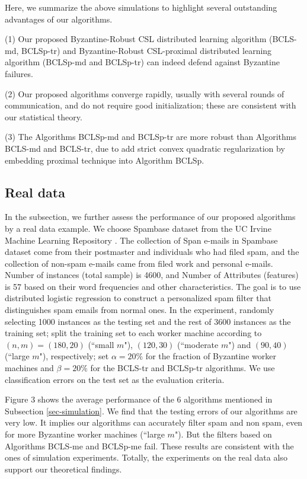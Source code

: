 \documentclass[12pt,a4paper]{article}%
\numberwithin{equation}{section}
\begin{document}
Here, we summarize the above simulations to highlight several outstanding advantages of our algorithms.

(1) Our proposed Byzantine-Robust CSL distributed learning algorithm (BCLS-md, BCLSp-tr) and Byzantine-Robust CSL-proximal distributed learning algorithm (BCLSp-md and BCLSp-tr) can indeed defend against Byzantine failures.

(2) Our proposed algorithms converge rapidly, usually with several rounds of communication, and do not require good initialization; these are consistent with our statistical theory.

(3) The Algorithms BCLSp-md and BCLSp-tr are more robust than Algorithms BCLS-md and BCLS-tr, due to add strict convex quadratic regularization by embedding proximal technique into Algorithm BCLSp.


\subsection{Real data}
In the subsection, we further assess the performance of our proposed algorithms by a real data example. We choose Spambase dataset from the UC Irvine Machine Learning Repository \citep{DuaGraff2017}. The collection of Span e-mails in Spambase dataset come from their postmaster and individuals who had filed spam, and the collection of non-spam e-mails came from filed work and personal e-mails. Number of instances (total sample) is 4600, and Number of Attributes (features) is 57 based on their word frequencies and other characteristics. The goal is to use distributed logistic regression to construct a personalized spam filter that distinguishes spam emails from normal ones. In the experiment, randomly selecting 1000 instances as the testing set and the rest of 3600 instances as the training set; split the training set to each worker machine according to $(n,m)=(180,20)$ (``small $m$"), $(120,30)$ (``moderate $m$") and $(90,40)$ (``large $m$"), respectively; set $\alpha=20\%$ for the fraction of Byzantine worker machines and $\beta=20\%$ for the BCLS-tr and BCLSp-tr algorithms. We use classification errors on the test set as the evaluation criteria.

Figure 3 shows the average performance of the 6 algorithms mentioned in Subsection \ref{sec-simulation}. We find that the testing errors of our algorithms are very low. It implies our algorithms can accurately filter spam and non spam, even for more Byzantine worker machines (``large $m$"). But the filters based on Algorithms BCLS-me and BCLSp-me fail. These results are consistent with the ones of simulation experiments. Totally, the experiments on the real data also support our theoretical findings.
\end{document}
